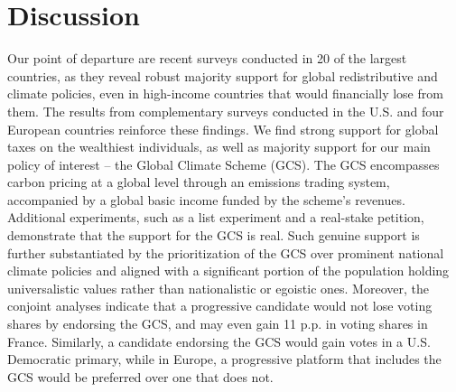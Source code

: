 \documentclass{nature}
\makeatletter
\renewenvironment*{figure}{\@float{figure}}{\end@float}
\makeatother
\begin{document}


\section{Discussion} %
Our point of departure are recent surveys conducted %
in 20 of the largest countries, %
as they reveal robust majority support for global redistributive and climate policies, even in high-income countries that would financially lose from them.\cite{dechezlepretre_fighting_2022} The results from complementary surveys conducted in the U.S. and four European countries %
reinforce these findings. We find strong support for global taxes on the wealthiest individuals, as well as majority support for our main policy of interest -- the Global Climate Scheme (GCS). The GCS encompasses carbon pricing at a global level through an emissions trading system, accompanied by a global basic income funded by the scheme's revenues. Additional experiments, such as a list experiment and a real-stake petition, demonstrate that the support for the GCS is real. 
Such genuine support is further substantiated by the prioritization of the GCS over prominent national climate policies and aligned with a significant portion of the population holding universalistic values rather than nationalistic or egoistic ones. Moreover, the conjoint analyses indicate that a progressive candidate would not lose voting shares by endorsing the GCS, and may even gain 11 p.p. in voting shares in France. Similarly, a candidate endorsing the GCS would gain votes in a U.S. Democratic primary, while in Europe, a progressive platform that includes the GCS would be preferred over one that does not.

\end{document}
